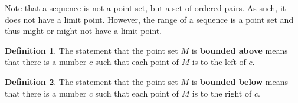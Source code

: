 \documentclass{article}
\theoremstyle{definition}
\newtheorem{definition}{Definition}
\begin{document}
Note that a sequence is not a point set, but a set of ordered pairs. As such, it does not have a limit point. However, the range of a sequence is a point set and thus might or might not have a limit point.

\begin{definition}
The statement that the point set $M$ is \textbf{bounded above} means that there is a number $c$ such that each point of $M$ is to the left of $c$.
\end{definition}

\begin{definition}
The statement that the point set $M$ is \textbf{bounded below} means that there is a number $c$ such that each point of $M$ is to the right of $c$.
\end{definition}
\end{document}
